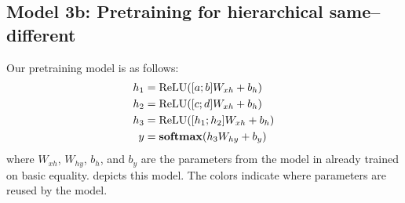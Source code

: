 \subsection{Model 3b: Pretraining for hierarchical same--different}\label{sec:model3b}

Our pretraining model is as follows:
%
\begin{align}
  h_1 &= \operatorname{ReLU}([a;b]W_{xh} + b_{h}) \label{eq:preh1-supp}\\
  h_2 &= \operatorname{ReLU}([c;d]W_{xh} + b_{h})\\
  h_3 &= \operatorname{ReLU}([h_1;h_2]W_{xh} + b_{h}) \\
  y &= \mathbf{softmax}(h_3W_{hy} + b_{y}) \label{eq:prey-supp}\
\end{align}
%
where $W_{xh}$, $W_{hy}$, $b_h$, and $b_y$ are the parameters from the model in  already trained on basic equality.  depicts this model. The colors indicate where parameters are reused by the model.


